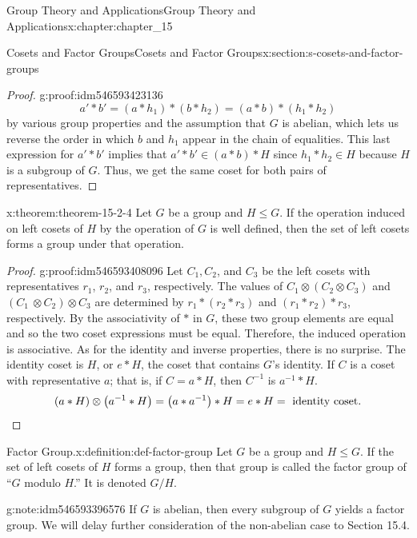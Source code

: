 \documentclass[oneside,10pt,]{book}
\newcommand{\qedhere}{\relax}
\numberwithin{equation}{section}
\begin{document}
\begin{chapterptx}{Group Theory and Applications}{}{Group Theory and Applications}{}{}{x:chapter:chapter_15}
\begin{sectionptx}{Cosets and Factor Groups}{}{Cosets and Factor Groups}{}{}{x:section:s-cosets-and-factor-groups}
\begin{proof}{}{g:proof:idm546593423136}
\begin{equation*}
a'*b' = (a*h_1)*(b*h_2) = (a*b)*(h_1*h_2)
\end{equation*}
by various group properties and the assumption that \(G\) is abelian, which lets us reverse the order in which \(b\) and \(h_1\) appear in the chain of equalities.  This last expression for \(a'*b'\) implies that \(a'*b' \in  (a*b)*H\) since \(h_1*h_2 \in  H\) because \(H\) is a subgroup of \(G\).  Thus, we get the same coset for both pairs of representatives.%
\end{proof}
\begin{theorem}{}{}{x:theorem:theorem-15-2-4}%
Let \(G\) be a group and \(H \leq  G\). If the operation induced on left cosets of \(H\) by the operation of \(G\) is well defined, then the set of left cosets forms a group under that operation.%
\end{theorem}
\begin{proof}{}{g:proof:idm546593408096}
Let \(C_1\)\(,C_2\), and \(C_3\) be the left cosets with representatives \(r_1\), \(r_2\), and \(r_3\), respectively.   The values of \(C_1 \otimes  \left(C_2 \otimes C_3\right)\) and \(\left(C_1\ \otimes  C_2\right)\otimes  C_3\) are determined by   \(r_1 * \left(r_2 * r_3\right)\) and \(\left(r_1 * r_2\right) * r_3\), respectively. By the associativity of \(*\) in \(G\), these two group elements are equal and so  the two coset expressions must be equal. Therefore, the induced operation is associative. As for the identity and inverse properties, there is no surprise. The identity coset is \(H\), or \(e*H\), the coset that contains \(G\)'s identity. If \(C\) is a coset with representative \(a\); that is, if  \(C = a*H\), then \(C^{-1}\) is \(a^{-1}*H\).%
\begin{equation*}
(a*H)\otimes  \left(a^{-1}*H\right) = \left(a*a^{-1}\right)*H = e*H = \textrm{ identity} \textrm{ coset}\text{.}\qedhere
\end{equation*}
%
\end{proof}
\begin{definition}{Factor Group.}{x:definition:def-factor-group}%
%
\label{g:notation:idm546593407456}%
Let \(G\) be a group and \(H \leq  G\). If the set of left cosets of \(H\) forms a group, then that group is called the factor group of ``\(G\) modulo \(H\).''   It is denoted \(G/H\).%
\end{definition}
\begin{note}{}{g:note:idm546593396576}%
If \(G\) is abelian, then every subgroup of \(G\) yields a factor group. We will delay further consideration of the non-abelian case to Section 15.4.%

\end{note}
\end{sectionptx}
\end{chapterptx}
\end{document}
